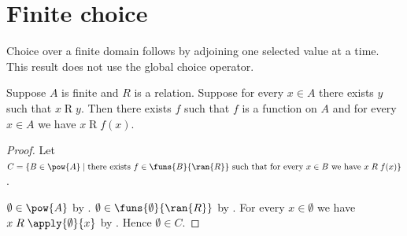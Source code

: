 \section{Finite choice}



Choice over a finite domain follows by adjoining one selected value at a
time.  This result does not use the global choice operator.

\begin{theorem}\label{finite_choice}
    Suppose $A$ is finite and $R$ is a relation.
    Suppose for every $x\in A$ there exists $y$ such that
        $x\mathrel{R}y$.
    Then there exists $f$ such that $f$ is a function on $A$ and
        for every $x\in A$ we have $x\mathrel{R}f(x)$.
\end{theorem}
\begin{proof}
    Let $C=\{B\in\pow{A}\mid
        \text{there exists $f\in\funs{B}{\ran{R}}$ such that
            for every $x\in B$ we have $x\mathrel{R}f(x)$}\}$.

    $\emptyset\in\pow{A}$ by .
    $\emptyset\in\funs{\emptyset}{\ran{R}}$ by
        .
    For every $x\in\emptyset$ we have
        $x\mathrel{R}\apply{\emptyset}{x}$ by .
    Hence $\emptyset\in C$.


\end{proof}
